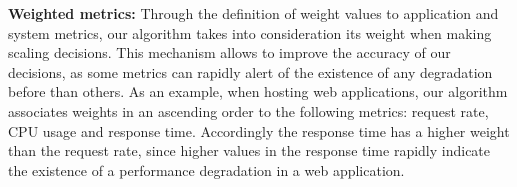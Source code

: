 
\textbf{Weighted metrics:}  Through the definition of weight values to application and system metrics, our algorithm takes into consideration its weight when making scaling decisions. This mechanism allows to improve the accuracy of our decisions, as some metrics can rapidly alert of the existence of any degradation before than others. As an example, when hosting web applications, our algorithm associates weights in an ascending order to the following metrics: request rate, CPU usage and response time. Accordingly the response time has a higher weight than the request rate, since higher values in the response time rapidly indicate the existence of a performance degradation in a web application. 




